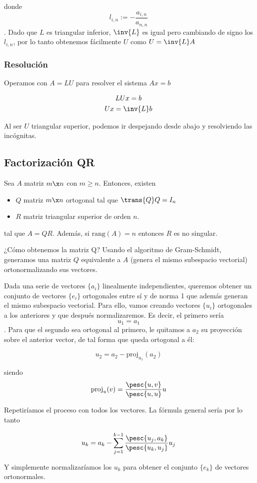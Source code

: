 \documentclass[nochap]{apuntes}
\begin{document}
donde \[ l_{i,n} := -\frac{a_{i,n}}{a_{n,n}} \]. Dado que $L$ es triangular inferior, $\inv{L}$ es igual pero cambiando de signo los $l_{i,n}$, por lo tanto obtenemos fácilmente $U$ como $U = \inv{L} A$

\subsubsection{Resolución}

Operamos con $A=LU$ para resolver el sistema $Ax = b$

\begin{gather*}
LUx = b \\
Ux = \inv{L} b \\
\end{gather*}

Al ser $U$ triangular superior, podemos ir despejando desde abajo y resolviendo las incógnitas.

\subsection{Factorización QR}

\begin{theorem}[Factorización\IS QR]
Sea $A$ matriz $m\x n$ con $m≥n$. Entonces, existen

\begin{itemize}
\item $Q$ matriz $m\x n$ ortogonal tal que $\trans{Q}Q = I_n$
\item $R$ matriz triangular superior de orden $n$.
\end{itemize}

tal que $A = QR$. Además, si $\text{rang}(A) = n$ entonces $R$ es no singular.
\end{theorem}

¿Cómo obtenemos la matriz Q? Usando el algoritmo de Gram-Schmidt, generamos una matriz $Q$ equivalente a $A$ (genera el mismo subespacio vectorial) ortonormalizando sus vectores.

\begin{defn}
Dada una serie de vectores $\{a_i\}$ linealmente independientes, queremos obtener un conjunto de vectores $\{e_i\}$ ortogonales entre sí y de norma 1 que además generan el mismo subespacio vectorial. Para ello, vamos creando vectores $\{u_i\}$ ortogonales a los anteriores y que después normalizaremos. Es decir, el primero sería \[u_1 = a_1 \]. Para que el segundo sea ortogonal al primero, le quitamos a $a_2$ su proyección sobre el anterior vector, de tal forma que queda ortogonal a él:

\[ u_2 = a_2 - \text{proj}_{u_1}(a_2) \]

siendo \[\text{proj}_{u}(v) = \frac{\pesc{u, v}}{\pesc{u, u}} u \]

Repetiríamos el proceso con todos los vectores. La fórmula general sería por lo tanto

\[ u_k = a_k - \sum_{j=1}^{k-1} \frac{\pesc{u_j, a_k}}{\pesc{u_k, u_j}} u_j \]

Y simplemente normalizaríamos los $u_k$ para obtener el conjunto $\{e_k\}$ de vectores ortonormales.
\end{defn}
\end{document}
